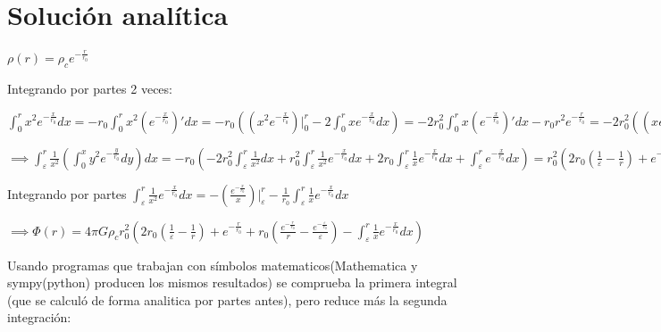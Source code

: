 \documentclass[12pt]{book}
\begin{document}
\clearpage

\section*{Solución analítica}
\begin{description}

\item  $\rho(r) =  \rho_c  e^{-\frac{r}{r_0}} $  
\item Integrando por partes 2 veces:
\item $\int_0^r{x^2 e^{-\frac{x}{r_0}}dx} = - r_0 \int_0^r{x^2 (e^{-\frac{x}{r_0}})\prime dx}
=-r_0( (x^2 e^{-\frac{x}{r_0}})\Big|_0^r  - 2\int_0^r{x e^{-\frac{x}{r_0}}dx})  = 
-2 r_0^2 \int_0^r{x (e^{-\frac{x}{r_0}})\prime dx} - r_0 r^2 e^{-\frac{r}{r_0}} = -2 r_0^2 ((x e^{-\frac{x}{r_0}})\Big|_0^r - \int_0^r{e^{-\frac{x}{r_0}}dx}) - r_0 r^2 e^{-\frac{r}{r_0}} = 
-2 r_0^3 e^{-\frac{x}{r_0}}\Big|_0^r -2 r_0^2 r e^{-\frac{r}{r_0}} - r_0 r^2 e^{-\frac{r}{r_0}} = 
2 r_0^3 -2 r_0^3 e^{-\frac{r}{r_0}} -2 r_0^2 r e^{-\frac{r}{r_0}} - r_0 r^2 e^{-\frac{r}{r_0}}  
= 2  r_0^3 -  r_0 e^{-\frac{r}{r_0}} (2 r_0^2  + 2 r_0 r + r^2)
$

\item $\implies \int_\varepsilon^r{ \frac{1}{x^2}(\int_0^x{y^2 e^{-\frac{y}{r_0}}dy})dx} = 
-r_0 (-2 r_0^2 \int_\varepsilon^r{\frac{1}{x^2}dx} + r_0^2 \int_\varepsilon^r{\frac{1}{x^2}e^{-\frac{x}{r_0}}dx}  + 2 r_0 \int_\varepsilon^r{\frac{1}{x} e^{-\frac{x}{r_0}}dx} + \int_\varepsilon^r{e^{-\frac{x}{r_0}}dx} ) = 
r_0^2 (2 r_0 (\frac{1}{\varepsilon} - \frac{1}{r})  + e^{-\frac{r}{r_0}} - r_0 \int_\varepsilon^r{\frac{1}{x^2}e^{-\frac{x}{r_0}}dx} - 2\int_\varepsilon^r{\frac{1}{x} e^{-\frac{x}{r_0}}dx} ) $
\item Integrando por partes $\int_\varepsilon^r{\frac{1}{x^2}e^{-\frac{x}{r_0}}dx} = -(\frac{e^{-\frac{x}{r_0}}}{x})\Big|_\varepsilon^r - \frac{1}{r_0} \int_\varepsilon^r{\frac{1}{x} e ^{-\frac{x}{r_0}}dx}  $

\item $\implies \Phi(r) = 4 \pi G \rho_c r_0^2 (2 r_0 (\frac{1}{\varepsilon} - \frac{1}{r}) + e^{-\frac{r}{r_0}} + r_0 (\frac{e^{-\frac{r}{r_0}}}{r} - \frac{e^{-\frac{\varepsilon}{r_0}}}{\varepsilon} ) -\int_\varepsilon^r{\frac{1}{x} e^{-\frac{x}{r_0}}dx} ) $

\item Usando programas que trabajan con símbolos matematicos(Mathematica y sympy(python) producen los mismos resultados) se comprueba la primera integral (que se calculó de forma analitica por partes antes), pero reduce más la segunda integración:


\end{description}
\end{document}
